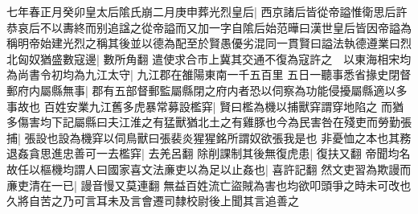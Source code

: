 七年春正月癸卯皇太后隂氏崩二月庚申葬光烈皇后|{
	西京諸后皆從帝謚惟衛思后許恭哀后不以夀終而别追諡之從帝謚而又加一字自隂后始范曄曰漢世皇后皆因帝謚為稱明帝始建光烈之稱其後並以德為配至於賢愚優劣混同一貫賢曰謚法執德遵業曰烈}
北匈奴猶盛數寇邊|{
	數所角翻}
遣使求合市上冀其交通不復為寇許之　以東海相宋均為尚書令初均為九江太守|{
	九江郡在雒陽東南一千五百里}
五日一聽事悉省掾史閉督郵府内屬縣無事|{
	郡有五部督郵監屬縣閉之府内者恐以伺察為功能侵擾屬縣適以多事故也}
百姓安業九江舊多虎暴常募設檻穽|{
	賢曰檻為機以捕獸穽謂穿地陷之}
而猶多傷害均下記屬縣曰夫江淮之有猛獸猶北土之有雞豚也今為民害咎在殘吏而勞勤張捕|{
	張設也設為機穽以伺鳥獸曰張裴炎猩猩銘所謂奴欲張我是也}
非憂恤之本也其務退姦貪思進忠善可一去檻穽|{
	去羌呂翻}
除削課制其後無復虎患|{
	復扶又翻}
帝聞均名故任以樞機均謂人曰國家喜文法亷吏以為足以止姦也|{
	喜許記翻}
然文吏習為欺謾而亷吏清在一已|{
	謾音慢又莫連翻}
無益百姓流亡盜賊為害也均欲叩頭爭之時未可改也久將自苦之乃可言耳未及言會遷司隸校尉後上聞其言追善之

